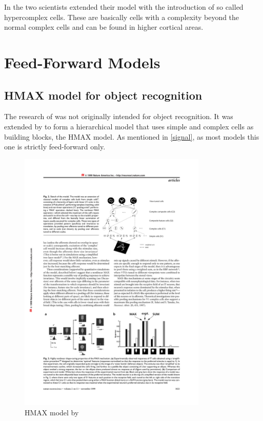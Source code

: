 			In \citep{hubel1965receptive} the two scientists extended their model with the introduction of so called hypercomplex cells. These are basically cells with a complexity beyond the normal complex cells and can be found in higher cortical areas.
			
	\section{Feed-Forward Models}
		
		\subsection{HMAX model for object recognition}\label{hmax}
		
			The research of \citeauthor{hubel1962receptive} was not originally intended for object recognition. It was extended by \citeauthor{riesenhuber1999hierarchical} to form a hierarchical model that uses simple and complex cells as building blocks, the HMAX model. As mentioned in \ref{signal}, as most models this one is strictly feed-forward only. 
		
			\begin{figure}[H]
				\centering
				\includegraphics[width=0.8\textwidth, trim= 9cm 18cm 2.5cm 4cm, clip]{images/riesenhuber-poggio-1999-models-p3.pdf}
				\caption{HMAX model by \citep{riesenhuber1999hierarchical}}
				\label{hmax-model}
			\end{figure}
			
